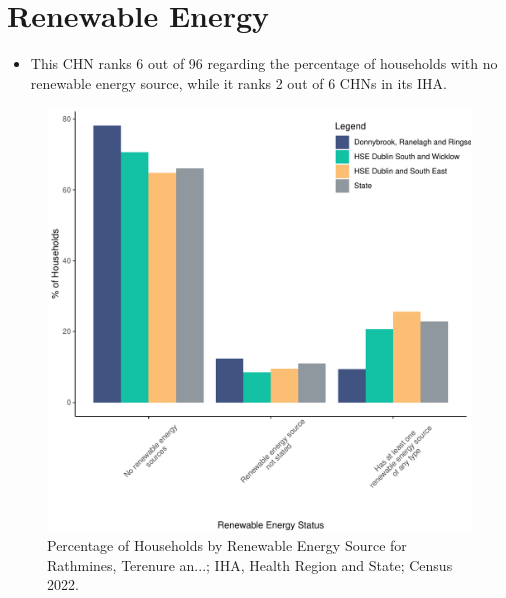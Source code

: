 \documentclass{article}
\begin{document}
\section{Renewable Energy}\label{sect:RE}
\begin{itemize}
\item This CHN ranks  6 out of 96 regarding the percentage of households with no renewable energy source, while it ranks   2 out of 6 CHNs in its IHA.
\end{itemize}
\begin{figure}[H]
	\centering
	\includegraphics[width = 140mm]{../figures/RenewableEnergyED.pdf}
	\caption{Percentage of Households by Renewable Energy Source for Rathmines, Terenure an...; IHA, Health Region and State; Census 2022.}
	\label{fig:vbnv}
	\end{figure}
\end{document}
